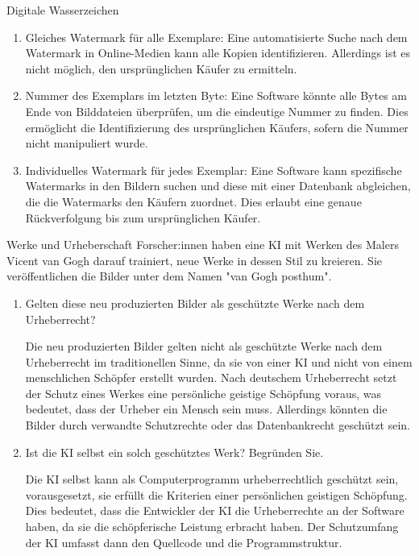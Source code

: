 \documentclass{article}
\begin{document}
\begin{exercise}{Digitale Wasserzeichen}
\begin{enumerate}
          \begin{solution}
            \begin{enumerate}
              \item Gleiches Watermark für alle Exemplare: Eine automatisierte Suche nach dem Watermark in Online-Medien kann alle Kopien identifizieren. Allerdings ist es nicht möglich, den ursprünglichen Käufer zu ermitteln.
              \item Nummer des Exemplars im letzten Byte: Eine Software könnte alle Bytes am Ende von Bilddateien überprüfen, um die eindeutige Nummer zu finden. Dies ermöglicht die Identifizierung des ursprünglichen Käufers, sofern die Nummer nicht manipuliert wurde.
              \item Individuelles Watermark für jedes Exemplar: Eine Software kann spezifische Watermarks in den Bildern suchen und diese mit einer Datenbank abgleichen, die die Watermarks den Käufern zuordnet. Dies erlaubt eine genaue Rückverfolgung bis zum ursprünglichen Käufer.
            \end{enumerate}
          \end{solution}
  \end{enumerate}
\end{exercise}



\begin{exercise}{Werke und Urheberschaft}
  Forscher:innen haben eine KI mit Werken des Malers Vicent van Gogh darauf trainiert, neue Werke in dessen Stil zu kreieren. Sie veröffentlichen die Bilder unter dem Namen "van Gogh posthum".
  \begin{enumerate}
    \item Gelten diese neu produzierten Bilder als geschützte Werke nach dem Urheberrecht?

          \begin{solution}
            Die neu produzierten Bilder gelten nicht als geschützte Werke nach dem Urheberrecht im traditionellen Sinne, da sie von einer KI und nicht von einem menschlichen Schöpfer erstellt wurden. Nach deutschem Urheberrecht setzt der Schutz eines Werkes eine persönliche geistige Schöpfung voraus, was bedeutet, dass der Urheber ein Mensch sein muss. Allerdings könnten die Bilder durch verwandte Schutzrechte oder das Datenbankrecht geschützt sein.
          \end{solution}
    \item Ist die KI selbst ein solch geschütztes Werk? Begründen Sie.

          \begin{solution}
            Die KI selbst kann als Computerprogramm urheberrechtlich geschützt sein, vorausgesetzt, sie erfüllt die Kriterien einer persönlichen geistigen Schöpfung. Dies bedeutet, dass die Entwickler der KI die Urheberrechte an der Software haben, da sie die schöpferische Leistung erbracht haben. Der Schutzumfang der KI umfasst dann den Quellcode und die Programmstruktur.
          \end{solution}
  \end{enumerate}
\end{exercise}
\end{document}

